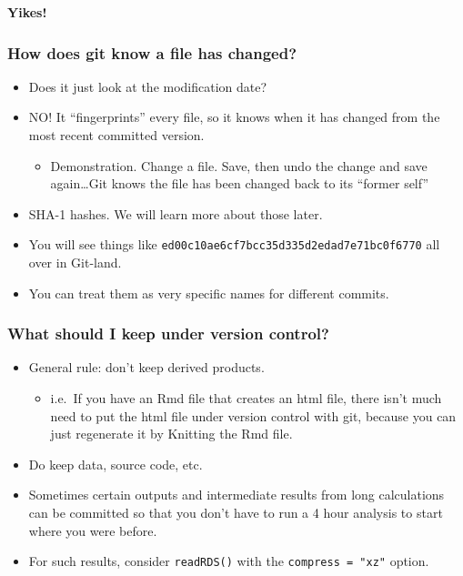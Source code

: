 \documentclass[]{book}
\providecommand{\tightlist}{%
  \setlength{\itemsep}{0pt}\setlength{\parskip}{0pt}}
\theoremstyle{definition}
\theoremstyle{definition}
\theoremstyle{remark}
\begin{document}
\textbf{Yikes!}

\subsubsection{How does git know a file has
changed?}\label{how-does-git-know-a-file-has-changed}

\begin{itemize}
\tightlist
\item
  Does it just look at the modification date?
\item
  NO! It ``fingerprints'' every file, so it knows when it has changed
  from the most recent committed version.

  \begin{itemize}
  \tightlist
  \item
    Demonstration. Change a file. Save, then undo the change and save
    again\ldots{}Git knows the file has been changed back to its
    ``former self''
  \end{itemize}
\item
  SHA-1 hashes. We will learn more about those later.\\
\item
  You will see things like
  \texttt{ed00c10ae6cf7bcc35d335d2edad7e71bc0f6770} all over in
  Git-land.
\item
  You can treat them as very specific names for different commits.
\end{itemize}

\subsubsection{What should I keep under version
control?}\label{what-should-i-keep-under-version-control}

\begin{itemize}
\tightlist
\item
  General rule: don't keep derived products.

  \begin{itemize}
  \tightlist
  \item
    i.e.~If you have an Rmd file that creates an html file, there isn't
    much need to put the html file under version control with git,
    because you can just regenerate it by Knitting the Rmd file.
  \end{itemize}
\item
  Do keep data, source code, etc.
\item
  Sometimes certain outputs and intermediate results from long
  calculations can be committed so that you don't have to run a 4 hour
  analysis to start where you were before.
\item
  For such results, consider \texttt{readRDS()} with the
  \texttt{compress\ =\ "xz"} option.
\end{itemize}
\end{document}

